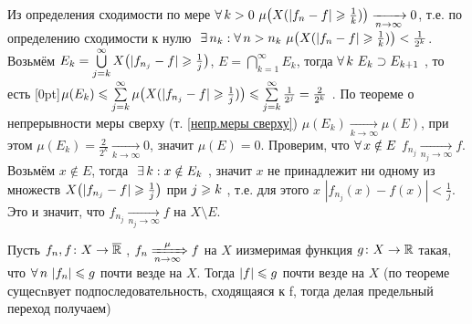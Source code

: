 \begin{prf}
	Из определения сходимости по мере $\forall \, k > 0\ \mu\bigl(X(|f_n - f|\geqslant \frac 1k )\bigr) \xrightarrow[n \to \infty]{} 0$, т.е. по определению сходимости к нулю$\E n_k : \A n > n_k\ \mu\bigl(X(|f_n - f|\biger \frac 1k )\bigr) < \frac{1}{2^k}$. Возьмём $E_k = \bigcup\limits_{j = k}^\infty X \bigl(|f_{n_j} - f| \geqslant \frac 1j\bigr)$, $E = \bigcap\limits_{k = 1}^\infty E_k$, тогда $\forall \, k\ E_k \supset E_{k + 1}$ , то есть \raisebox{0pt}[0pt]{$\mu(E_k) \leqslant \sum\limits_{j = k}^\infty \mu \bigl(X(|f_{n_j} - f| \geqslant \frac 1j)\bigr) \leqslant \sum\limits_{j = k}^\infty \frac {1}{2^j} = \frac{2}{2^k}$} . По теореме о непрерывности меры сверху (т. \ref{непр.меры сверху}) $\mu(E_k) \xrightarrow[k \to \infty]{} \mu(E)$, при этом $\mu(E_k) = \frac{2}{2^k} \xrightarrow[k \to \infty]{} 0$, значит $\mu(E) = 0$. Проверим, что $\forall \, x \notin E$ $f_{n_j} \xrightarrow[n_j \to \infty]{} f$. Возьмём $x \notin E$, тогда$\E k : x \notin E_k$ , значит $x$ не принадлежит ни одному из множеств $X \bigl(|f_{n_j} - f| \geqslant \frac 1j\bigr)$ при $j \geqslant k$ , т.е. для этого $x$ $|f_{n_j}(x) - f(x)| < \! \frac 1j$. Это и значит, что $f_{n_j}\!\! \xrightarrow[n_j \to \infty]{}\!\! f$ на $X \setminus E$.
\end{prf}

\begin{slv}[https://www.youtube.com/live/fVyBKDoy3EM?si=wT0qU9F8ttuaAyQk&t=3831]
	Пусть $f_n, f \colon X \to \overline{\mathbb R}$ , $f_n \xRightarrow[n \to \infty]{\mu}f$ на $X$ и\E измеримая функция $g \colon X \to \mathbb R$ такая, что $\forall \, n\ |f_n| \leqslant g$ почти везде на $X$. Тогда $|f| \leqslant g$ почти везде на $X$ (по теореме сущесnвует подпоследовательность, сходящаяся к f, тогда делая предельный переход получаем)
\end{slv}